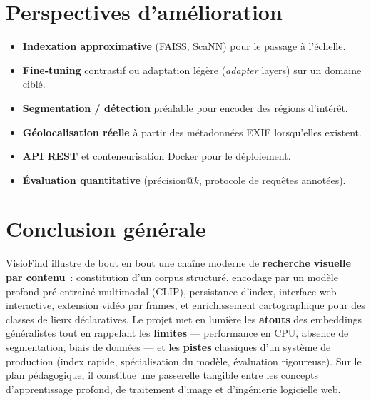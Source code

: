 \documentclass[11pt,a4paper,openany]{report}
\begin{document}
\chapter{Perspectives d'amélioration}

\begin{itemize}[leftmargin=*]
  \item \textbf{Indexation approximative} (FAISS, ScaNN) pour le passage à l'échelle.
  \item \textbf{Fine-tuning} contrastif ou adaptation légère (\emph{adapter} layers) sur un domaine ciblé.
  \item \textbf{Segmentation / détection} préalable pour encoder des régions d'intérêt.
  \item \textbf{Géolocalisation réelle} à partir des métadonnées EXIF lorsqu'elles existent.
  \item \textbf{API REST} et conteneurisation Docker pour le déploiement.
  \item \textbf{Évaluation quantitative} (précision@$k$, protocole de requêtes annotées).
\end{itemize}

\chapter{Conclusion générale}

VisioFind illustre de bout en bout une chaîne moderne de \textbf{recherche visuelle par contenu}~: constitution d'un corpus structuré, encodage par un modèle profond pré-entraîné multimodal (CLIP), persistance d'index, interface web interactive, extension vidéo par frames, et enrichissement cartographique pour des classes de lieux déclaratives. Le projet met en lumière les \textbf{atouts} des embeddings généralistes tout en rappelant les \textbf{limites} — performance en CPU, absence de segmentation, biais de données — et les \textbf{pistes} classiques d'un système de production (index rapide, spécialisation du modèle, évaluation rigoureuse). Sur le plan pédagogique, il constitue une passerelle tangible entre les concepts d'apprentissage profond, de traitement d'image et d'ingénierie logicielle web.
\end{document}
